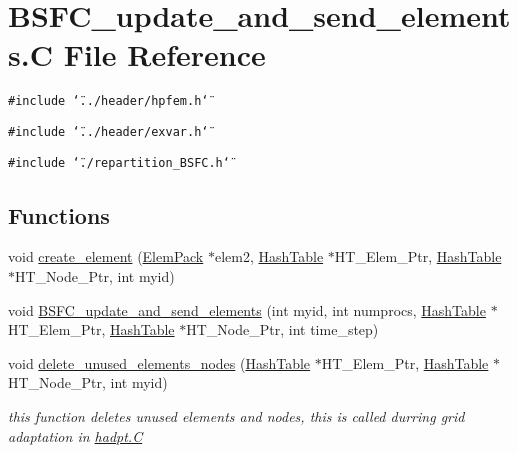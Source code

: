 \hypertarget{BSFC__update__and__send__elements_8C}{
\section{BSFC\_\-update\_\-and\_\-send\_\-elements.C File Reference}
\label{BSFC__update__and__send__elements_8C}
}
{\tt \#include \char`\"{}../header/hpfem.h\char`\"{}}\par
{\tt \#include \char`\"{}../header/exvar.h\char`\"{}}\par
{\tt \#include \char`\"{}./repartition\_\-BSFC.h\char`\"{}}\par
\subsection*{Functions}
\begin{CompactItemize}
\item 
void \hyperlink{BSFC__update__and__send__elements_8C_a0}{create\_\-element} (\hyperlink{structElemPack}{Elem\-Pack} $\ast$elem2, \hyperlink{classHashTable}{Hash\-Table} $\ast$HT\_\-Elem\_\-Ptr, \hyperlink{classHashTable}{Hash\-Table} $\ast$HT\_\-Node\_\-Ptr, int myid)
\item 
void \hyperlink{BSFC__update__and__send__elements_8C_a1}{BSFC\_\-update\_\-and\_\-send\_\-elements} (int myid, int numprocs, \hyperlink{classHashTable}{Hash\-Table} $\ast$HT\_\-Elem\_\-Ptr, \hyperlink{classHashTable}{Hash\-Table} $\ast$HT\_\-Node\_\-Ptr, int time\_\-step)
\item 
void \hyperlink{BSFC__update__and__send__elements_8C_a2}{delete\_\-unused\_\-elements\_\-nodes} (\hyperlink{classHashTable}{Hash\-Table} $\ast$HT\_\-Elem\_\-Ptr, \hyperlink{classHashTable}{Hash\-Table} $\ast$HT\_\-Node\_\-Ptr, int myid)
\begin{CompactList}\small\item\em this function deletes unused elements and nodes, this is called durring grid adaptation in \hyperlink{constant_8h_a21}{hadpt.C} \item\end{CompactList}\end{CompactItemize}


